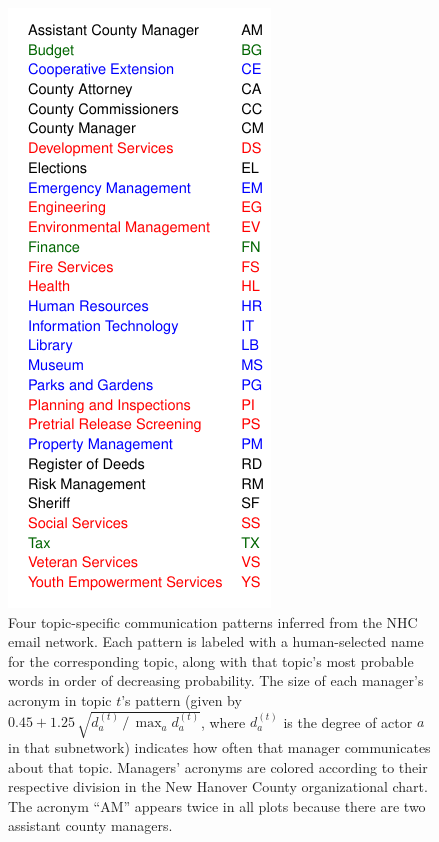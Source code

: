 \begin{figure}[t]
\begin{minipage}[b]{0.5\linewidth}
\begin{tabular}{cc}
\end{tabular}
\end{minipage}
\begin{minipage}{0.5\linewidth}
\hspace{3.25cm}\vspace{-0.4cm} \includegraphics[scale=.85]{department_key}
\end{minipage}
\caption{Four topic-specific communication patterns inferred from the
  NHC email network. Each pattern is labeled with a human-selected
  name for the corresponding topic, along with that topic's most
  probable words in order of decreasing probability. The size of each
  manager's acronym in topic $t$'s pattern (given by $0.45 +
  1.25\,\sqrt{d^{(t)}_a \,/\, \max_a d^{(t)}_a}$, where $d^{(t)}_a$ is
  the degree of actor $a$ in that subnetwork) indicates how often that
  manager communicates about that topic.  Managers' acronyms are
  colored according to their respective division in the New
  Hanover County organizational chart. The acronym ``AM'' appears
  twice in all plots because there are two assistant county managers.}
\label{Figure:LatentSpace}
\end{figure}

